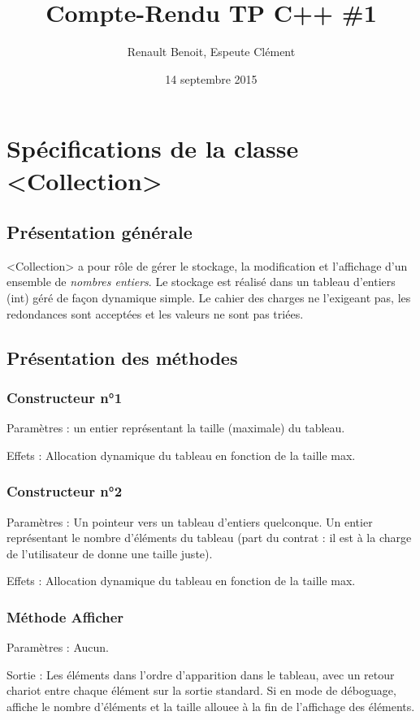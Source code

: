 \documentclass[11pt]{article}
\title{Compte-Rendu TP C++ \#1}
\author{{\sc Renault} Benoit, {\sc Espeute} Clément}
\date{14 septembre 2015}
\begin{document}
\pagestyle{fancy}
\maketitle

\section{Spécifications de la classe <Collection>}

\subsection{Présentation générale}
	<Collection> a pour rôle de gérer le stockage, la modification et l'affichage d'un ensemble de \emph{nombres entiers}. Le stockage est réalisé dans un tableau d'entiers (int) géré de façon dynamique simple. Le cahier des charges ne l'exigeant pas, les redondances sont acceptées et les valeurs ne sont pas triées.

\subsection{Présentation des méthodes}

\subsubsection*{Constructeur n°1}
Paramètres : un entier représentant la taille (maximale) du tableau.

\noindent Effets : Allocation dynamique du tableau en fonction de la taille max.

\subsubsection*{Constructeur n°2}
Paramètres : 
Un pointeur vers un tableau d’entiers quelconque. 
Un entier représentant le nombre d’éléments du tableau (part du contrat : il est à la charge de l’utilisateur de donne une taille juste).

\noindent Effets : Allocation dynamique du tableau en fonction de la taille max.

\subsubsection*{Méthode Afficher}
Paramètres : Aucun.

\noindent Sortie : Les éléments dans l’ordre d’apparition dans le tableau, avec un retour chariot entre chaque élément sur la sortie standard. Si en mode de déboguage, affiche le nombre d’éléments et la taille allouee à la fin de l’affichage des éléments.
\end{document}
